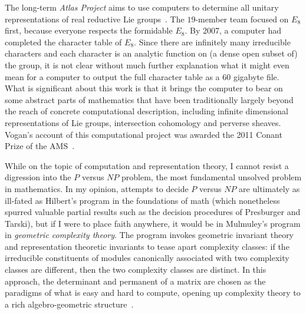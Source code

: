 \documentclass{llncs}
\begin{document}
The long-term {\it Atlas Project} aims to use computers to determine
all unitary representations of real reductive Lie groups~\cite{Atlas}.
The $19$-member team   focused on $E_8$
first, because everyone respects the formidable $E_8$.  By 2007, a
computer had completed the character table of $E_8$.  Since there are
infinitely many irreducible characters and each character is an
analytic function on (a dense open subset of) the group, it is not
clear without much further explanation what it might even mean for a
computer to output the full character table as a $60$ gigabyte file.  What
is significant about this work is that it brings the computer to bear
on some abstract parts of mathematics that have been traditionally
largely beyond the reach of concrete computational description,
including infinite dimensional representations of Lie groups,
intersection cohomology and perverse sheaves.  Vogan's account of this
computational project was awarded the 2011 Conant Prize of the
AMS~\cite{VE8}.






While on the topic of computation and representation theory, I cannot
resist a digression into the $P$ versus $NP$ problem, the most
fundamental unsolved problem in mathematics. In my opinion, attempts
to decide $P$ versus $NP$ are ultimately as ill-fated as Hilbert's
program in the foundations of math (which nonetheless spurred valuable
partial results such as the decision procedures of Presburger and
Tarski), but if I were to place faith anywhere, it would be in
Mulmuley's program in {\it geometric complexity theory}.  The program
invokes geometric invariant theory and representation theoretic
invariants to tease apart complexity classes: if the irreducible
constituents of modules canonically associated with two complexity
classes are different, then the two complexity classes are distinct.
In this approach, the determinant and permanent of a matrix are chosen
as the paradigms of what is easy and hard to compute, opening up
complexity theory to a rich algebro-geometric structure~\cite{Mul11}.
\end{document}
